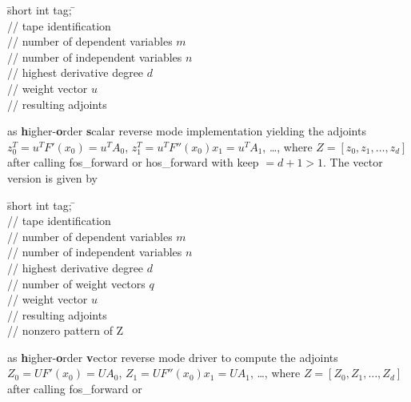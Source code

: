 \documentclass[11pt,twoside]{article}
\begin{document}
\begin{tabbing}
\hspace{0.5in}\={\sf short int tag;} \hspace{1.1in}\= \kill    %
\\
         \> // tape identification \\
                 \> // number of  dependent variables $m$\\
                 \> // number of independent variables $n$\\
                 \> // highest derivative degree $d$\\
           \> // weight vector $u$\\
      \> // resulting adjoints
\end{tabbing}                 
as {\bf h}igher-{\bf o}rder {\bf s}calar reverse mode implementation yielding
the adjoints $z_0^T=u^T F'(x_0)=u^T A_0$, $z_1^T=u^T F''(x_0)x_1=u^T A_1$, 
\ldots, where $Z=[z_0,z_1,\ldots,z_d]$ after calling  {\sf fos\_forward} or 
{\sf hos\_forward} with {\sf keep} $=d+1>1$. The vector version is given by
\begin{tabbing}
\hspace{0.5in}\={\sf short int tag;} \hspace{1.1in}\= \kill    %
\\
         \> // tape identification \\
                 \> // number of  dependent variables $m$\\
                 \> // number of independent variables $n$\\
                 \> // highest derivative degree $d$\\
                 \> // number of weight vectors $q$\\
        \> // weight vector $u$\\
   \> // resulting adjoints\\
    \> // nonzero pattern of {\sf Z}
\end{tabbing}                 
as {\bf h}igher-{\bf o}rder {\bf v}ector reverse mode driver to compute
the adjoints $Z_0=U F'(x_0)=U A_0$, $Z_1=U F''(x_0)x_1=U A_1$, 
\ldots, where $Z=[Z_0,Z_1,\ldots,Z_d]$ after calling  {\sf fos\_forward} or 
\end{document}
